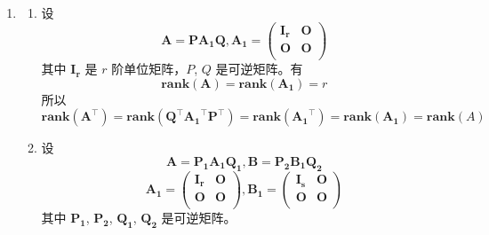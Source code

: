 \documentclass[11pt,letter,notitlepage]{article}
\newcommand{\rank}[1]{ \textbf{rank}  (#1)  }
\begin{document}
\begin{solution}
	\begin{enumerate}
		\item \begin{enumerate}
			      \item 设
			            $$\mathbf{A}=\mathbf{P}\mathbf{A_1}\mathbf{Q},
				            \mathbf{A_1}=\begin{pmatrix}
					            \mathbf{I_r} & \mathbf{O} \\
					            \mathbf{O}   & \mathbf{O} \\
				            \end{pmatrix}$$
			            其中 $\mathbf{I_r}$ 是 $r$ 阶单位矩阵，$P$, $Q$ 是可逆矩阵。有
			            $$\rank{\mathbf{A}}=\rank{\mathbf{A_1}}=r$$
			            所以
			            $$\rank{\mathbf{A}^{\top}}
				            =\rank{\mathbf{Q}^{\top}\mathbf{A_1}^{\top}\mathbf{P}^{\top}}
				            =\rank{\mathbf{A_1}^{\top}}
				            =\rank{\mathbf{A_1}}
				            =\rank{A}$$
			      \item 设
			            $$\mathbf{A}=\mathbf{P_1}\mathbf{A_1}\mathbf{Q_1}, \mathbf{B}=\mathbf{P_2}\mathbf{B_1}\mathbf{Q_2}$$
			            $$\mathbf{A_1}=\begin{pmatrix}
					            \mathbf{I_r} & \mathbf{O} \\
					            \mathbf{O}   & \mathbf{O} \\
				            \end{pmatrix},
				            \mathbf{B_1}=\begin{pmatrix}
					            \mathbf{I_s} & \mathbf{O} \\
					            \mathbf{O}   & \mathbf{O} \\
				            \end{pmatrix}$$
			            其中 $\mathbf{P_1}$, $\mathbf{P_2}$, $\mathbf{Q_1}$, $\mathbf{Q_2}$ 是可逆矩阵。


\end{enumerate}
\end{enumerate}
\end{solution}
\end{document}

